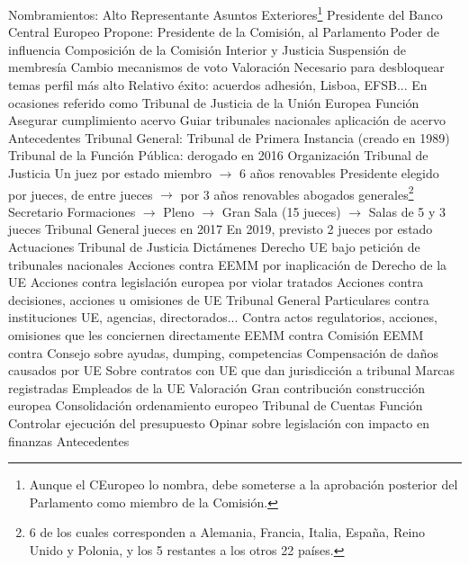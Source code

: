 \documentclass{nuevotema}
\begin{document}
\begin{esquemal}
				\4 Nombramientos:
				\4[] Alto Representante Asuntos Exteriores\footnote{Aunque el CEuropeo lo nombra, debe someterse a la aprobación posterior del Parlamento como miembro de la Comisión.}
				\4[] Presidente del Banco Central Europeo
				\4 Propone:
				\4[] Presidente de la Comisión, al Parlamento
				\4 Poder de influencia
				\4[] Composición de la Comisión
				\4[] Interior y Justicia
				\4[] Suspensión de membresía
				\4[] Cambio mecanismos de voto
			\3 Valoración
				\4 Necesario para desbloquear temas perfil más alto
				\4 Relativo éxito: acuerdos adhesión, Lisboa, EFSB...
				\4 En ocasiones referido como 
		\2 Tribunal de Justicia de la Unión Europea
			\3 Función
				\4 Asegurar cumplimiento acervo
				\4 Guiar tribunales nacionales aplicación de acervo
			\3 Antecedentes
				\4 Tribunal General:
				\4[] Tribunal de Primera Instancia (creado en 1989)
				\4 Tribunal de la Función Pública:
				\4[] derogado en 2016
			\3 Organización
				\4 Tribunal de Justicia
				\4[] Un juez por estado miembro
				\4[] $\to$ 6 años renovables
				\4[] Presidente elegido por jueces, de entre jueces
				\4[] $\to$ por 3 años renovables
				 abogados generales\footnote{6 de los cuales corresponden a Alemania, Francia, Italia, España, Reino Unido y Polonia, y los 5 restantes a los otros 22 países.}
				 Secretario
				\4[] Formaciones
				\4[] $\to$ Pleno
				\4[] $\to$ Gran Sala (15 jueces)
				\4[] $\to$ Salas de 5 y 3 jueces
				\4 Tribunal General
				 jueces en 2017
				\4[] En 2019, previsto 2 jueces por estado
			\3 Actuaciones
				\4 Tribunal de Justicia
				\4[] Dictámenes Derecho UE bajo petición de tribunales nacionales
				\4[] Acciones contra EEMM por inaplicación de Derecho de la UE
				\4[] Acciones contra legislación europea por violar tratados
				\4[] Acciones contra decisiones, acciones u omisiones de UE
				\4 Tribunal General
				\4[] Particulares contra instituciones UE, agencias, directorados...
				\4[] Contra actos regulatorios, acciones, omisiones que les conciernen directamente
				\4[] EEMM contra Comisión
				\4[] EEMM contra Consejo sobre ayudas, dumping, competencias
				\4[] Compensación de daños causados por UE
				\4[] Sobre contratos con UE que dan jurisdicción a tribunal
				\4[] Marcas registradas
				\4[] Empleados de la UE
			\3 Valoración
				\4 Gran contribución construcción europea
				\4 Consolidación ordenamiento europeo
		\2 Tribunal de Cuentas
			\3 Función
				\4 Controlar ejecución del presupuesto
				\4 Opinar sobre legislación con impacto en finanzas
			\3 Antecedentes

\end{esquemal}
\end{document}
